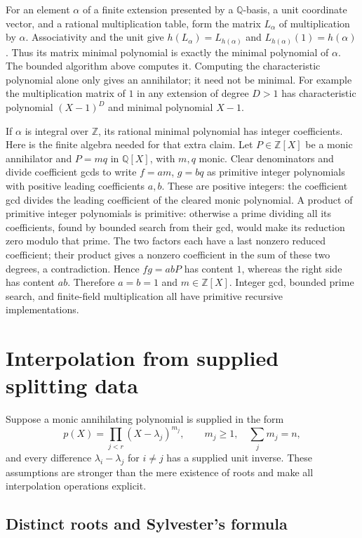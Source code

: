 For an element $\alpha$ of a finite extension presented by a
$\mathbb Q$-basis, a unit coordinate vector, and a rational multiplication
table, form the matrix $L_\alpha$ of multiplication by $\alpha$.
Associativity and the unit give
$h(L_\alpha)=L_{h(\alpha)}$ and
$L_{h(\alpha)}(1)=h(\alpha)$. Thus its matrix minimal polynomial is
exactly the minimal polynomial of $\alpha$. The bounded algorithm above
computes it. Computing the characteristic polynomial alone only gives
an annihilator; it need not be minimal. For example the multiplication
matrix of $1$ in any extension of degree $D>1$ has characteristic
polynomial $(X-1)^D$ and minimal polynomial $X-1$.

If $\alpha$ is integral over $\mathbb Z$, its rational minimal polynomial
has integer coefficients. Here is the finite algebra needed for that
extra claim. Let $P\in\mathbb Z[X]$ be a monic annihilator and
$P=mq$ in $\mathbb Q[X]$, with $m,q$ monic. Clear denominators and
divide coefficient gcds to write $f=am$, $g=bq$ as primitive integer
polynomials with positive leading coefficients $a,b$. These are positive
integers: the coefficient gcd divides the leading coefficient of the
cleared monic polynomial. A product of
primitive integer polynomials is primitive: otherwise a prime dividing
all its coefficients, found by bounded search from their gcd, would
make its reduction zero modulo that prime. The two factors each have
a last nonzero reduced coefficient; their product gives a nonzero
coefficient in the sum of these two degrees, a contradiction. Hence
$fg=abP$ has content $1$, whereas the right side has content $ab$.
Therefore $a=b=1$ and $m\in\mathbb Z[X]$. Integer gcd, bounded prime
search, and finite-field multiplication all have primitive recursive
implementations.

\section{Interpolation from supplied splitting data}

Suppose a monic annihilating polynomial is supplied in the form
\[
 p(X)=\prod_{j<r}(X-\lambda_j)^{m_j},\qquad
 m_j\geq1,\quad\sum_jm_j=n,
\]
and every difference $\lambda_i-\lambda_j$ for $i\ne j$ has a supplied
unit inverse. These assumptions are stronger than the mere existence of
roots and make all interpolation operations explicit.

\subsection{Distinct roots and Sylvester's formula}

